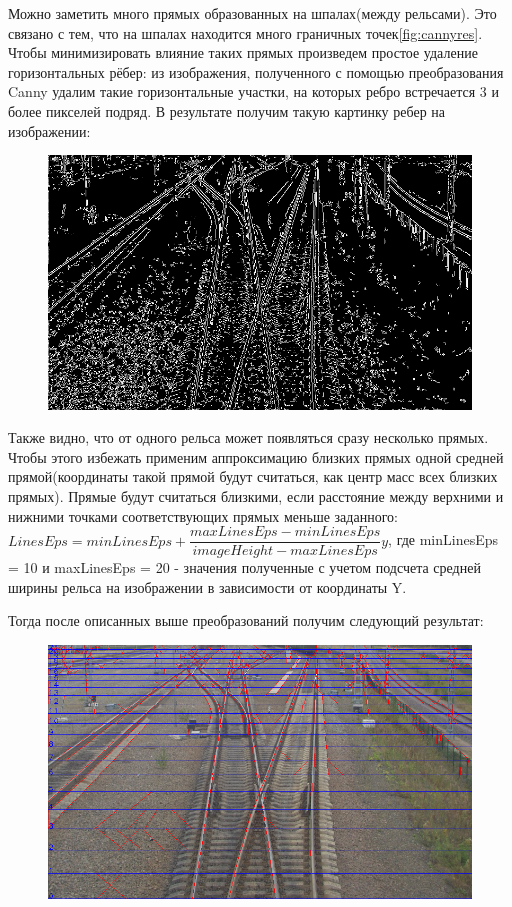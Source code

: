 \newpage
Можно заметить много прямых образованных на шпалах(между рельсами). Это связано с тем, что на шпалах находится много граничных точек\ref{fig:cannyres}. 
Чтобы минимизировать влияние таких прямых произведем простое удаление горизонтальных рёбер: из изображения, полученного с помощью преобразования Canny удалим такие горизонтальные участки, на которых ребро встречается 3 и более пикселей подряд.
В результате получим такую картинку ребер на изображении:
\begin{figure}[!h]
	\centering
	\includegraphics[width=0.9\linewidth]{pictures/screenshot0014}
	\caption{}
	\label{fig:canny_remove_horizontal}
\end{figure}

Также видно, что от одного рельса может появляться сразу несколько прямых. Чтобы этого избежать применим аппроксимацию близких прямых одной средней прямой(координаты такой прямой будут считаться, как центр масс всех близких прямых). 
Прямые будут считаться близкими, если расстояние между верхними и нижними точками соответствующих прямых меньше заданного: \newline
$LinesEps = minLinesEps + \dfrac{maxLinesEps - minLinesEps}{imageHeight - maxLinesEps}y$, \newline 
где minLinesEps = 10 и maxLinesEps = 20 - значения полученные с учетом подсчета средней ширины рельса на изображении в зависимости от координаты Y.

Тогда после описанных выше преобразований получим следующий результат:
\begin{figure}[!h]
	\centering
	\includegraphics[width=0.9\linewidth]{pictures/screenshot0013}
	\caption{}
	\label{fig:screenshot0013}
\end{figure}

